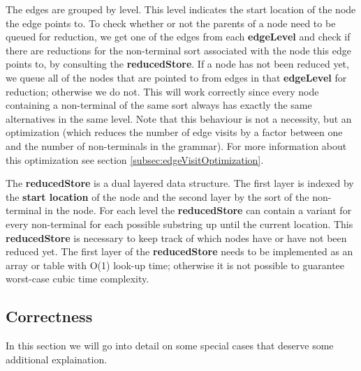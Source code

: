 \documentclass[a4paper,10pt]{article}
\begin{document}
The edges are grouped by level. This level indicates the start location of the node the edge points to. To check whether or not the parents of a node need to be queued for reduction, we get one of the edges from each {\bf edgeLevel} and check if there are reductions for the non-terminal sort associated with the node this edge points to, by consulting the {\bf reducedStore}. If a node has not been reduced yet, we queue all of the nodes that are pointed to from edges in that {\bf edgeLevel} for reduction; otherwise we do not. This will work correctly since every node containing a non-terminal of the same sort always has exactly the same alternatives in the same level. Note that this behaviour is not a necessity, but an optimization (which reduces the number of edge visits by a factor between one and the number of non-terminals in the grammar). For more information about this optimization see section \ref{subsec:edgeVisitOptimization}.

The {\bf reducedStore} is a dual layered data structure. The first layer is indexed by the {\bf start location} of the node and the second layer by the sort of the non-terminal in the node. For each level the {\bf reducedStore} can contain a variant for every non-terminal for each possible substring up until the current location. This {\bf reducedStore} is necessary to keep track of which nodes have or have not been reduced yet. The first layer of the {\bf reducedStore} needs to be implemented as an array or table with O(1) look-up time; otherwise it is not possible to guarantee worst-case cubic time complexity.

\subsection{Correctness}

In this section we will go into detail on some special cases that deserve some additional explaination.
\end{document}
